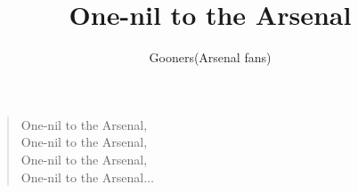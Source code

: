 \documentclass[a4paper,12pt]{article}
\title{One-nil to the Arsenal}
\author{Gooners(Arsenal fans)}
\date{}
\begin{document}
	
	\maketitle
	
	\begin{verse}
		
		One-nil to the Arsenal, \\
		One-nil to the Arsenal, \\
		One-nil to the Arsenal, \\
		One-nil to the Arsenal$\ldots$
		
	\end{verse}
\end{document}
